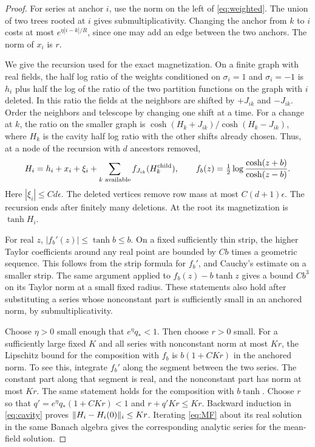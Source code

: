 \documentclass[11pt]{article}
\DeclarePairedDelimiter{\norm}{\lVert}{\rVert}
\begin{document}
\begin{proof}
For series at anchor \(i\), use the norm on the left of
\eqref{eq:weighted}. The union of two trees rooted at \(i\) gives
submultiplicativity. Changing the anchor from \(k\) to \(i\) costs at
most \(e^{\eta|i-k|/R}\), since one may add an edge between the two
anchors. The norm of \(x_i\) is \(r\).

We give the recursion used for the exact magnetization. On a finite
graph with real fields, the half log ratio of the weights conditioned
on \(\sigma_i=1\) and \(\sigma_i=-1\) is \(h_i\) plus half the log of the
ratio of the two partition functions on the graph with \(i\) deleted.
In this ratio the fields at the neighbors are shifted by \(+J_{ik}\)
and \(-J_{ik}\). Order the neighbors and telescope by changing one shift
at a time. For a change at \(k\), the ratio on the smaller graph is
\(\cosh(H_k+J_{ik})/\cosh(H_k-J_{ik})\), where \(H_k\) is the cavity
half log ratio with the other shifts already chosen. Thus, at a node
of the recursion with \(d\) ancestors removed,
\begin{equation}\label{eq:cavity}
 H_i=h_i+x_i+\xi_i+
       \sum_{k\text{ available}} f_{J_{ik}}(H_k^{\rm child}),
 \qquad
 f_b(z)=\tfrac12\log\frac{\cosh(z+b)}{\cosh(z-b)}.
\end{equation}
Here \(|\xi_i|\le C d\epsilon\). The deleted vertices remove row mass at
most \(C(d+1)\epsilon\). The recursion ends after finitely many
deletions. At the root its magnetization is \(\tanh H_i\).

For real \(z\), \(|f_b'(z)|\le\tanh b\le b\). On a fixed sufficiently
thin strip, the higher Taylor coefficients around any real point
are bounded by \(C b\) times a geometric sequence. This follows from
the strip formula for \(f_b'\), and Cauchy's estimate on a smaller
strip. The same argument applied to
\(f_b(z)-b\tanh z\) gives a bound \(C b^3\) on its Taylor norm at a
small fixed radius. These statements also hold after substituting
a series whose nonconstant part is sufficiently small in an anchored
norm, by submultiplicativity.

Choose \(\eta>0\) small enough that \(e^\eta q_*<1\). Then choose
\(r>0\) small. For a sufficiently large fixed \(K\) and all series
with nonconstant norm at most \(Kr\), the Lipschitz bound for the
composition with \(f_b\) is \(b(1+CKr)\) in the anchored norm.
To see this, integrate \(f_b'\) along the segment between the two
series. The constant part along that segment is real, and the
nonconstant part has norm at most \(Kr\).
The same statement holds for the composition with \(b\tanh\).
Choose \(r\) so that \(q'=e^\eta q_*(1+CKr)<1\) and
\(r+q'Kr\le Kr\). Backward induction in \eqref{eq:cavity} proves
\(\norm{H_i-H_i(0)}_i\le Kr\). Iterating \eqref{eq:MF} about its real
solution in the same Banach algebra gives the corresponding analytic
series for the mean-field solution.


\end{proof}
\end{document}
